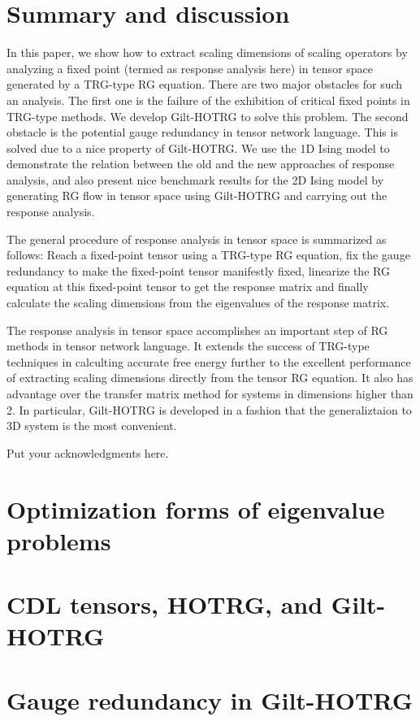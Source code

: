 \documentclass[aps,prb,reprint,superscriptaddress]{revtex4-2}
\begin{document}
\section{Summary and discussion}
In this paper, we show how to extract scaling dimensions of scaling
operators by analyzing a fixed point (termed as response analysis
here) in tensor space generated by a TRG-type RG equation. There are two
major obstacles for such an analysis. The first one is the failure of
the exhibition of critical fixed points in TRG-type methods. We develop
Gilt-HOTRG to solve this problem. The second obstacle is the potential
gauge redundancy in tensor network language. This is solved due to a
nice property of Gilt-HOTRG.  We use the 1D Ising model to demonstrate
the relation between the old and the new approaches of response
analysis, and also present nice benchmark results for the 2D Ising model
by generating RG flow in tensor space using Gilt-HOTRG and carrying out
the response analysis. 
%

The general procedure of response analysis in tensor space is summarized
as follows: Reach a fixed-point tensor using a TRG-type RG equation, fix
the gauge redundancy to make the fixed-point tensor manifestly fixed,
linearize the RG equation at this fixed-point tensor to get the response
matrix and finally calculate the scaling dimensions from the
eigenvalues of the response matrix.
%

The response analysis in tensor space accomplishes an important step of
RG methods in tensor network language. It extends the success of
TRG-type techniques in calculting accurate free energy further to
the excellent performance of extracting scaling dimensions directly from
the tensor RG equation. It also has advantage over the transfer matrix
method for systems in dimensions higher than 2. In particular,
Gilt-HOTRG is developed in a fashion that the generaliztaion to 3D
system is the most convenient.


\begin{acknowledgments}
Put your acknowledgments here.

\blindtext
\end{acknowledgments}

\appendix
\section{Optimization forms of eigenvalue problems\label{appd:opteig}}
\blindtext
\section{CDL tensors, HOTRG, and Gilt-HOTRG\label{appd:cdlHOTRG}}
\blindtext
\section{Gauge redundancy in Gilt-HOTRG\label{appd:gaugeFix}}
\blindtext



\end{document}
